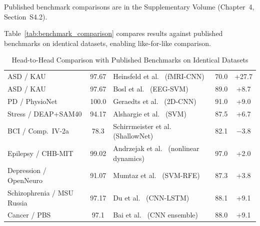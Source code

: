 Published benchmark comparisons are in the Supplementary Volume (Chapter~4, Section~S4.2).

\iffalse
Table~\ref{tab:benchmark_comparison} compares results against published benchmarks on identical datasets, enabling like-for-like comparison.

\iffalse %
\begin{table}[!htbp]
\tablestripes
\caption[Benchmark Comparison]{Head-to-Head Comparison with Published Benchmarks on Identical Datasets}
\tablefontsize
\begin{tabularx}{\textwidth}{@{} L C L C C @{}}
\toprule
{} &  &  &  &  \\
\midrule
ASD / KAU & 97.67 & Heinsfeld et al.~\cite{heinsfeld2018identification} (fMRI-CNN) & 70.0 & +27.7 \\
\addlinespace
ASD / KAU & 97.67 & Bosl et al.~\cite{bosl2018eeg} (EEG-SVM) & 89.0 & +8.7 \\
\addlinespace
PD / PhysioNet & 100.0 & Geraedts et al.~\cite{geraedts2018eeg} (2D-CNN) & 91.0 & +9.0 \\
\addlinespace
Stress / DEAP+SAM40 & 94.17 & Alshargie et al.~\cite{alshargie2018mental} (SVM) & 87.5 & +6.7 \\
\addlinespace
BCI / Comp.\ IV-2a & 78.3 & Schirrmeister et al.~\cite{schirrmeister2017deep} (ShallowNet) & 82.1 & $-$3.8 \\
\addlinespace
Epilepsy / CHB-MIT & 99.02 & Andrzejak et al.~\cite{andrzejak2001indications} (nonlinear dynamics) & 97.0 & +2.0 \\
\addlinespace
Depression / OpenNeuro & 91.07 & Mumtaz et al.~\cite{mumtaz2017eeg_mdd} (SVM-RFE) & 87.3 & +3.8 \\
\addlinespace
Schizophrenia / MSU Russia & 97.17 & Du et al.~\cite{du2020eeg_schiz} (CNN-LSTM) & 88.1 & +9.1 \\
\addlinespace
Cancer / PBS & 97.1 & Bai et al.~\cite{bai2020cancer} (CNN ensemble) & 88.0 & +9.1 \\
\bottomrule
\end{tabularx}

\end{table}
